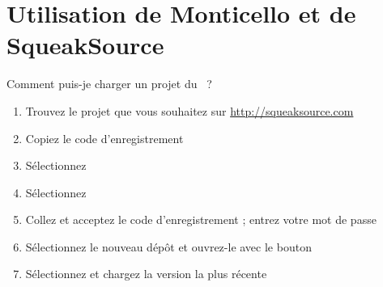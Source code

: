 \documentclass[a4paper,10pt,twoside]{book}
\begin{document}
\section{Utilisation de Monticello et de SqueakSource}

\begin{faq}
Comment puis-je charger un projet du ~?
\end{faq}
\answer
\begin{enumerate}
  \item Trouvez le projet que vous souhaitez sur \url{http://squeaksource.com}
  \item Copiez le code d'enregistrement
  \item Sélectionnez 
  \item Sélectionnez 
  \item Collez et acceptez le code d'enregistrement ; entrez votre mot de passe
  \item Sélectionnez le nouveau dépôt et ouvrez-le avec le bouton 
  \item Sélectionnez et chargez la version la plus récente
\end{enumerate}
\end{document}
